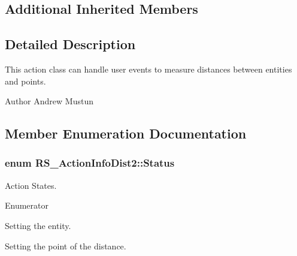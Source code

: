 \subsection*{Additional Inherited Members}


\subsection{Detailed Description}
This action class can handle user events to measure distances between entities and points.

\begin{DoxyAuthor}{Author}
Andrew Mustun 
\end{DoxyAuthor}


\subsection{Member Enumeration Documentation}
\hypertarget{classRS__ActionInfoDist2_a4672176d63c9f9c88755cb537f709764}{
\subsubsection[{Status}]{\setlength{\rightskip}{0pt plus 5cm}enum {\bf R\-S\-\_\-\-Action\-Info\-Dist2\-::\-Status}}}\label{classRS__ActionInfoDist2_a4672176d63c9f9c88755cb537f709764}
Action States. \begin{Desc}
\item[Enumerator]\par
\begin{description}
\item[{\em 
\hypertarget{classRS__ActionInfoDist2_a4672176d63c9f9c88755cb537f709764af0d5602c326e563dad725ce3a2312f73}{Set\-Entity}\label{classRS__ActionInfoDist2_a4672176d63c9f9c88755cb537f709764af0d5602c326e563dad725ce3a2312f73}
}]Setting the entity. \item[{\em 
\hypertarget{classRS__ActionInfoDist2_a4672176d63c9f9c88755cb537f709764ad090aab5223f6c2a1ee01de2079d0eb7}{Set\-Point}\label{classRS__ActionInfoDist2_a4672176d63c9f9c88755cb537f709764ad090aab5223f6c2a1ee01de2079d0eb7}
}]Setting the point of the distance. \end{description}
\end{Desc}


